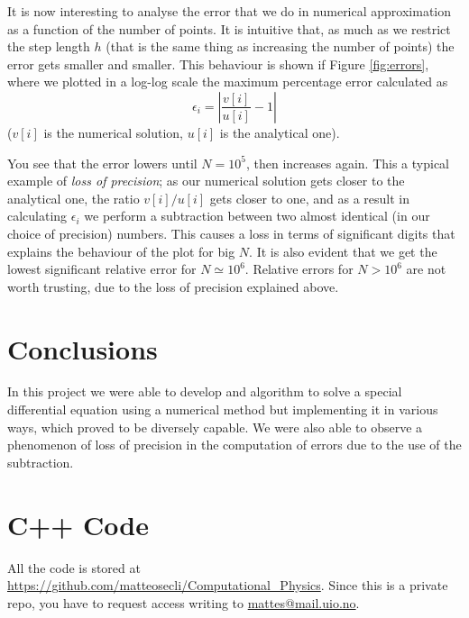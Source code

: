 \documentclass {article}
\begin{document}
It is now interesting to analyse the error that we do in numerical approximation as a function of the number of points. It is intuitive that, as much as we restrict the step length $h$ (that is the same thing as increasing the number of points) the error gets smaller and smaller. This behaviour is shown if Figure \ref{fig:errors}, where we plotted in a log-log scale the maximum percentage error calculated as
\begin{equation*}
	\epsilon_i = \left| \frac{v[i]}{u[i]} - 1 \right|
\end{equation*}
($v[i]$ is the numerical solution, $u[i]$ is the analytical one).

You see that the error lowers until $N = 10^{5}$, then increases again. This a typical example of \emph{loss of precision}; as our numerical solution gets closer to the analytical one, the ratio $v[i]/u[i]$ gets closer to one, and as a result in calculating $\epsilon_i$ we perform a subtraction between two almost identical (in our choice of precision) numbers. This causes a loss in terms of significant digits that explains the behaviour of the plot for big $N$. It is also evident that we get the lowest significant relative error for $N \simeq 10^{6}$. Relative errors for $N > 10^{6}$ are not worth trusting, due to the loss of precision explained above.

\section{Conclusions}

In this project we were able to develop and algorithm to solve a special differential equation using a numerical method but implementing it in various ways, which proved to be diversely capable. We were also able to observe a phenomenon of loss of precision in the computation of errors due to the use of the subtraction. 

\newpage
\section{C++ Code}
\label{sec:code}

All the code is stored at \url{https://github.com/matteosecli/Computational_Physics}. Since this is a private repo, you have to request access writing to \href{mailto:mattes@mail.uio.no}{mattes@mail.uio.no}.
\end{document}
